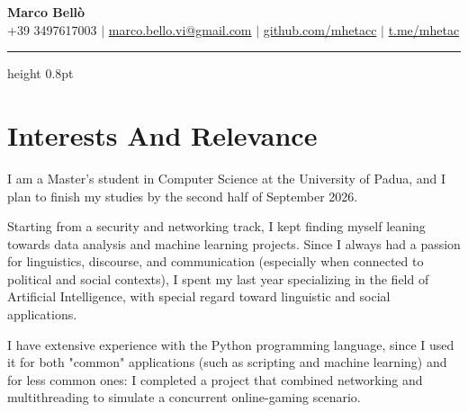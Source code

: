 \documentclass[12pt,a4paper,sans]{moderncv} %
\begin{document}
\begin{center}
    \textbf{\Huge Marco Bellò} \\ \vspace{5pt}
    \small \faMobile* +39 3497617003 \hspace{1pt} $|$
    \hspace{1pt} \faEnvelope \hspace{2pt} \href{mailto:marco.bello.vi@gmail.com}{marco.bello.vi@gmail.com} \hspace{1pt} $|$ 
    \hspace{1pt} \faGithub \hspace{2pt} \href{https://github.com/mhetacc}{github.com/mhetacc} \hspace{1pt} $|$
    \hspace{1pt} \faTelegram \hspace{2pt} \href{https://t.me/mhetac}{t.me/mhetac}
    \\ \vspace{-3pt}
\end{center}
\vspace{10pt} %

{\color{venetianred} \hrule height 0.8pt}

\vspace{10pt}
\section{Interests And Relevance}

I am a Master's student in Computer Science at the University of Padua, and I plan to finish my studies by the second half of September 2026.

Starting from a security and networking track, I kept finding myself leaning towards data analysis and machine learning projects. Since I always had a passion for linguistics, discourse, and communication (especially when connected to political and social contexts), I spent my last year specializing in the field of Artificial Intelligence, with special regard toward linguistic and social applications. 

\vspace{2mm}

I have extensive experience with the Python programming language, since I used it for both "common" applications (such as scripting and machine learning) and for less common ones: I completed a project that combined networking and multithreading to simulate a concurrent online-gaming scenario.
\end{document}
